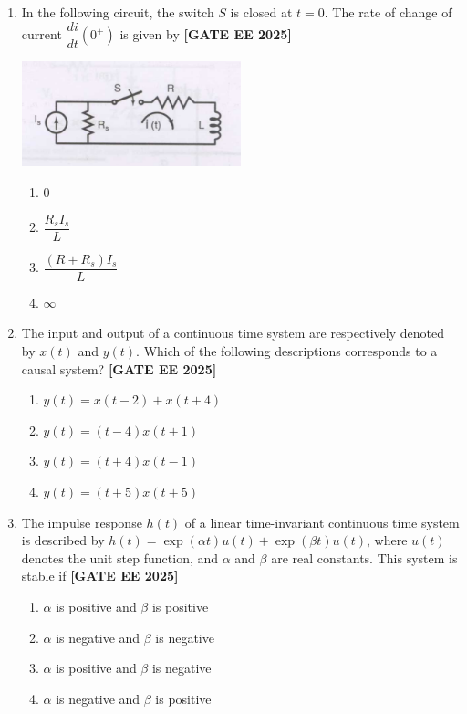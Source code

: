 \documentclass[12pt,a4paper]{article}
\begin{document}
\begin{enumerate}[leftmargin=2.5em, label=\textbf{Q.\arabic*}., itemsep=2em]

\item In the following circuit, the switch $S$ is closed at $t = 0$. The rate of change of current $\dfrac{di}{dt}(0^+)$ is given by
\newline
\noindent \textbf{[GATE EE 2025]}
\begin{center}
\includegraphics[width=0.5\textwidth]{figs/q8.png}
\end{center}
\begin{enumerate}[label=(\Alph*)]
    \item 0
    \item $\dfrac{R_s I_s}{L}$
    \item $\dfrac{(R+R_s) I_s}{L}$
    \item $\infty$
\end{enumerate}

\item The input and output of a continuous time system are respectively denoted by $x(t)$ and $y(t)$. Which of the following descriptions corresponds to a causal system?
\newline
\noindent \textbf{[GATE EE 2025]}
\begin{enumerate}[label=(\Alph*)]
    \item $y(t) = x(t-2) + x(t+4)$
    \item $y(t) = (t-4) x(t+1)$
    \item $y(t) = (t+4) x(t-1)$
    \item $y(t) = (t+5) x(t+5)$
\end{enumerate}

\item The impulse response $h(t)$ of a linear time-invariant continuous time system is described by $h(t) = \exp(\alpha t) u(t) + \exp(\beta t) u(t)$, where $u(t)$ denotes the unit step function, and $\alpha$ and $\beta$ are real constants. This system is stable if
\newline
\noindent \textbf{[GATE EE 2025]}
\begin{enumerate}[label=(\Alph*)]
    \item $\alpha$ is positive and $\beta$ is positive
    \item $\alpha$ is negative and $\beta$ is negative
    \item $\alpha$ is positive and $\beta$ is negative
    \item $\alpha$ is negative and $\beta$ is positive
\end{enumerate}


\end{enumerate}
\end{document}
